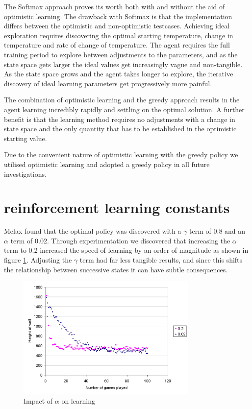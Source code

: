 \documentclass{rucsthesis}
\begin{document}
The Softmax approach proves its worth both with and without the aid of optimistic learning. The drawback with Softmax is that the implementation differs between the optimistic and non-optimistic testcases. Achieving ideal exploration requires discovering the optimal starting temperature, change in temperature and rate of change of temperature. The agent requires the full training period to explore between adjustments to the parameters, and as the state space gets larger the ideal values get increasingly vague and non-tangible. As the state space grows and the agent takes longer to explore, the iterative discovery of ideal learning parameters get progressively more painful.

The combination of optimistic learning and the greedy approach results in the agent learning incredibly rapidly and settling on the optimal solution. A further benefit is that the learning method requires no adjustments with a change in state space and the only quantity that has to be established in the optimistic starting value.

Due to the convenient nature of optimistic learning with the greedy policy we utilised optimistic learning and adopted a greedy policy in all future investigations.

\section{reinforcement learning constants}

Melax found that the optimal policy was discovered with a $\gamma$ term of 0.8 and an $\alpha$ term of 0.02. Through experimentation we discovered that increasing the $\alpha$ term to 0.2 increased the speed of learning by an order of magnitude as shown in figure \ref{fig:alpha}. Adjusting the $\gamma$ term had far less tangible results, and since this shifts the relationship between successive states it can have subtle consequences.

\begin{figure}[h]
\centering
\includegraphics[width=3.5in]{alphacomp.png}
\caption{Impact of $\alpha$ on learning}
\label{fig:alpha}
\end{figure} 
\end{document}
